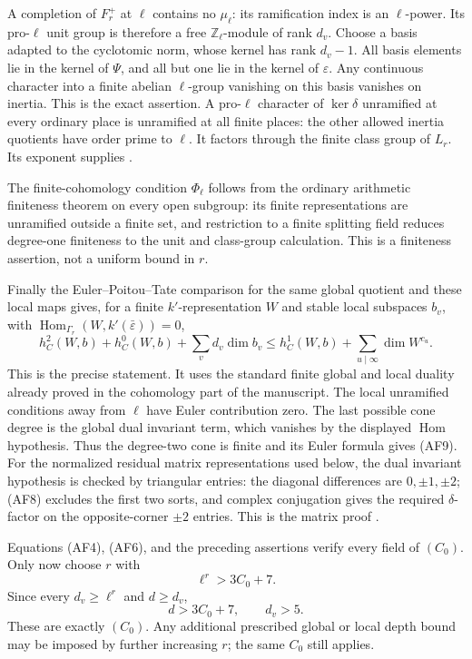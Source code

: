 A completion of \(F_r^+\) at \(\ell\) contains no
\(\mu_\ell\): its ramification index is an
\(\ell\)-power.
Its pro-\(\ell\) unit group is therefore a free
\(\mathbb Z_\ell\)-module of rank \(d_v\).
Choose a basis adapted to the cyclotomic norm,
whose kernel has rank \(d_v-1\).
All basis elements lie in the kernel of \(\Psi\),
and all but one lie in the kernel of \(\varepsilon\).
Any continuous character into a finite abelian
\(\ell\)-group vanishing on this basis vanishes on
inertia.
This is the exact  assertion.
A pro-\(\ell\) character of \(\ker\delta\) unramified
at every ordinary place is unramified at all finite
places: the other allowed inertia quotients have
order prime to \(\ell\).
It factors through the finite class group of \(L_r\).
Its exponent supplies .

The finite-cohomology condition \(\Phi_\ell\) follows
from the ordinary arithmetic finiteness theorem on
every open subgroup: its finite representations
are unramified outside a finite set, and restriction
to a finite splitting field reduces degree-one
finiteness to the unit and class-group calculation.
This is a finiteness assertion, not a uniform
bound in \(r\).

Finally the Euler--Poitou--Tate comparison for the
same global quotient and these local maps gives,
for a finite \(k'\)-representation \(W\) and stable
local subspaces \(b_v\), with
\(\operatorname{Hom}_{\Gamma_r}
       (W,k'(\bar\varepsilon))=0\),
\[
 h_C^2(W,b)+h_C^0(W,b)+\sum_v d_v\dim b_v
       \le h_C^1(W,b)+\sum_{u\mid\infty}\dim W^{c_u}.            \tag{AF9}
\]
This is the precise  statement.
It uses the standard finite global and local duality
already proved in the cohomology part of the manuscript.
The local unramified conditions away from \(\ell\)
have Euler contribution zero.
The last possible cone degree is the global dual
invariant term, which vanishes by the displayed
\(\operatorname{Hom}\) hypothesis.
Thus the degree-two cone is finite and its Euler
formula gives (AF9).
For the normalized residual matrix representations
used below, the dual invariant hypothesis is checked
by triangular entries: the diagonal differences are
\(0,\pm1,\pm2\); (AF8) excludes the first two sorts,
and complex conjugation gives the required
\(\delta\)-factor on the opposite-corner
\(\pm2\) entries.
This is the matrix proof
.

Equations (AF4), (AF6), and the preceding assertions
verify every field of \((C_0)\).
Only now choose \(r\) with
\[
                        \ell^r>3C_0+7 .                       \tag{AF10}
\]
Since every \(d_v\ge\ell^r\) and \(d\ge d_v\),
\[
                         d>3C_0+7,\qquad d_v>5 .
\]
These are exactly \((C_0)\).
Any additional prescribed global or local depth
bound may be imposed by further increasing \(r\);
the same \(C_0\) still applies.

